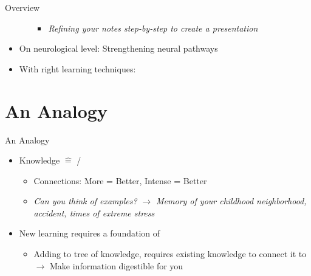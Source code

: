 \documentclass{ercisbeamer}
\begin{document}
\begin{frame}{Overview}
\begin{tbox}
\begin{itemize}
\begin{itemize}
\begin{itemize}
                    \item \emph{Refining your notes step-by-step to create a presentation}
                \end{itemize}
            \end{itemize}
            \item On neurological level: Strengthening neural pathways
            \item With right learning techniques: 
        \end{itemize}
    \end{tbox}
\end{frame}

\section{An Analogy}
\begin{frame}{An Analogy}
    \pause
    \begin{tbox}
        \begin{itemize}
            \item Knowledge $\widehat =$   /  
            \begin{itemize}
                \item Connections: More = Better, Intense = Better
                \item \emph{Can you think of examples?} \pause \emph{$\rightarrow$ Memory of your childhood neighborhood, accident, times of extreme stress}
            \end{itemize}
            \item New learning requires a foundation of 
            \begin{itemize}
                \item Adding to tree of knowledge, requires existing knowledge to connect it to \\ $\rightarrow$ Make information digestible for you
            \end{itemize}
        \end{itemize}
    \end{tbox}
\end{frame}
\end{document}
